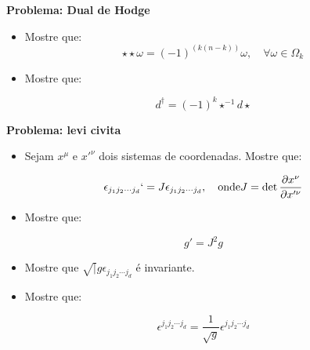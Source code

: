 \begin{framed}
\textbf{Problema: \textbf{Dual de Hodge}}\\
\begin{itemize}
\item Mostre que:
\begin{equation}
\star \star \omega = (-1)^{(k(n-k))} \omega, \quad \forall \omega \in \Omega_k
\end{equation}


\item Mostre que:
\end{itemize}

\begin{equation}
d^\dagger = (-1)^{k}\star^{-1} d \star
\end{equation}
\end{framed}

\begin{framed}
\textbf{Problema: \textbf{levi civita}}\\
\begin{itemize}
\item Sejam $x^\mu$ e $x'^\nu$ dois sistemas de coordenadas. Mostre que:
\end{itemize}

\begin{equation}
\epsilon_{j_1 j_2 \cdots j_d }` = J \epsilon_{j_1 j_2 \cdots j_d }, \quad \mathrm{onde} \\
J = \det \frac{\partial x^\nu}{\partial x'^\nu}
\end{equation}

\begin{itemize}
\item Mostre que:
\end{itemize}

\begin{equation}
g' = J^2 g
\end{equation}

\begin{itemize}
\item Mostre que $\sqrt|{g} \epsilon_{j_1 j_2 \cdots j_d }$ é invariante.


\item Mostre que:
\end{itemize}

\begin{equation}
\epsilon^{j_1 j_2 \cdots j_d } = \frac{1}{\sqrt{g}} \epsilon^{j_1 j_2 \cdots j_d }
\end{equation}
\end{framed}

